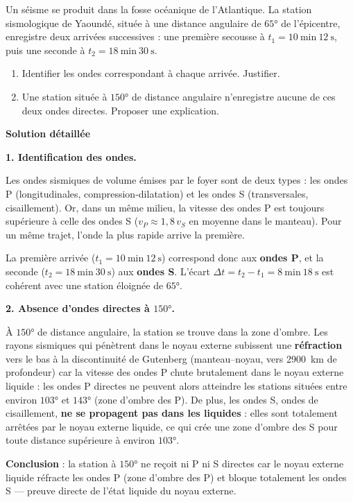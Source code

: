 \documentclass[11pt]{article}
\newcommand{\cle}[1]{{\popxbold\color{popdark}#1}}
\begin{document}
\begin{exoresolu}
Un séisme se produit dans la fosse océanique de l'Atlantique. La station sismologique de Yaoundé, située à une distance angulaire de $65°$ de l'épicentre, enregistre deux arrivées successives : une première secousse à $t_1 = 10~\text{min}~12~\text{s}$, puis une seconde à $t_2 = 18~\text{min}~30~\text{s}$.
\begin{enumerate}
\item Identifier les ondes correspondant à chaque arrivée. Justifier.
\item Une station située à $150°$ de distance angulaire n'enregistre aucune de ces deux ondes directes. Proposer une explication.
\end{enumerate}
\tcblower
\textbf{Solution détaillée}

\textbf{1. Identification des ondes.}

Les ondes sismiques de volume émises par le foyer sont de deux types : les ondes P (longitudinales, compression-dilatation) et les ondes S (transversales, cisaillement). Or, dans un même milieu, la vitesse des ondes P est toujours supérieure à celle des ondes S ($v_P \approx 1{,}8\,v_S$ en moyenne dans le manteau). Pour un même trajet, l'onde la plus rapide arrive la première.

La première arrivée ($t_1 = 10~\text{min}~12~\text{s}$) correspond donc aux \textbf{ondes P}, et la seconde ($t_2 = 18~\text{min}~30~\text{s}$) aux \textbf{ondes S}. L'écart $\Delta t = t_2 - t_1 = 8~\text{min}~18~\text{s}$ est cohérent avec une station éloignée de $65°$.

\textbf{2. Absence d'ondes directes à $150°$.}

À $150°$ de distance angulaire, la station se trouve dans la \cle{zone d'ombre}. Les rayons sismiques qui pénètrent dans le noyau externe subissent une \textbf{réfraction} vers le bas à la discontinuité de Gutenberg (manteau--noyau, vers \SI{2900}{km} de profondeur) car la vitesse des ondes P chute brutalement dans le noyau externe liquide : les ondes P directes ne peuvent alors atteindre les stations situées entre environ $103°$ et $143°$ (zone d'ombre des P). De plus, les ondes S, ondes de cisaillement, \textbf{ne se propagent pas dans les liquides} : elles sont totalement arrêtées par le noyau externe liquide, ce qui crée une zone d'ombre des S pour toute distance supérieure à environ $103°$.

\textbf{Conclusion} : la station à $150°$ ne reçoit ni P ni S directes car le noyau externe liquide réfracte les ondes P (zone d'ombre des P) et bloque totalement les ondes S — preuve directe de l'état liquide du noyau externe.
\end{exoresolu}
\end{document}
